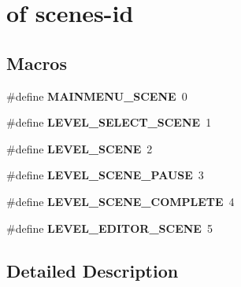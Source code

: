 \hypertarget{group___constants}{}\section{of scenes-\/id}
\label{group___constants}
\subsection*{Macros}
\begin{DoxyCompactItemize}
\item 
\mbox{\label{group___constants_gab816c4e51d50463081105f6bac1f334e}} 
\#define {\bfseries M\+A\+I\+N\+M\+E\+N\+U\+\_\+\+S\+C\+E\+NE}~0
\item 
\mbox{\label{group___constants_ga7c624a5bdde49f9ecfe0bffe1b0590f2}} 
\#define {\bfseries L\+E\+V\+E\+L\+\_\+\+S\+E\+L\+E\+C\+T\+\_\+\+S\+C\+E\+NE}~1
\item 
\mbox{\label{group___constants_ga8174122322f40f70f3f86a0b591a6bfc}} 
\#define {\bfseries L\+E\+V\+E\+L\+\_\+\+S\+C\+E\+NE}~2
\item 
\mbox{\label{group___constants_gaeada4e626f47261a732346e3f3f27e89}} 
\#define {\bfseries L\+E\+V\+E\+L\+\_\+\+S\+C\+E\+N\+E\+\_\+\+P\+A\+U\+SE}~3
\item 
\mbox{\label{group___constants_ga56eea14bfd46e3f63aa5301987317b8e}} 
\#define {\bfseries L\+E\+V\+E\+L\+\_\+\+S\+C\+E\+N\+E\+\_\+\+C\+O\+M\+P\+L\+E\+TE}~4
\item 
\mbox{\label{group___constants_gae1fd7596d3213753209782f52841431f}} 
\#define {\bfseries L\+E\+V\+E\+L\+\_\+\+E\+D\+I\+T\+O\+R\+\_\+\+S\+C\+E\+NE}~5
\end{DoxyCompactItemize}


\subsection{Detailed Description}
